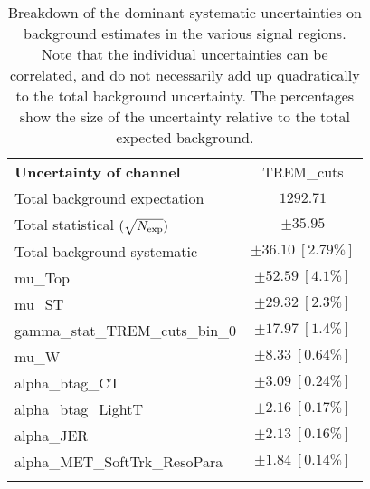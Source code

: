 
\begin{table}
\begin{center}
\setlength{\tabcolsep}{0.0pc}
\begin{tabular*}{\textwidth}{@{\extracolsep{\fill}}lc}
\noalign{\smallskip}\hline\noalign{\smallskip}
{\bf Uncertainty of channel}                                    & TREM\_cuts            \\
\noalign{\smallskip}\hline\noalign{\smallskip}
Total background expectation             &  $1292.71$       \\
\noalign{\smallskip}\hline\noalign{\smallskip}
Total statistical $(\sqrt{N_{\rm exp}})$              & $\pm 35.95$       \\
Total background systematic               & $\pm 36.10\ [2.79\%] $             \\
\noalign{\smallskip}\hline\noalign{\smallskip}
\noalign{\smallskip}\hline\noalign{\smallskip}
mu\_Top         & $\pm 52.59\ [4.1\%] $       \\
mu\_ST         & $\pm 29.32\ [2.3\%] $       \\
gamma\_stat\_TREM\_cuts\_bin\_0         & $\pm 17.97\ [1.4\%] $       \\
mu\_W         & $\pm 8.33\ [0.64\%] $       \\
alpha\_btag\_CT         & $\pm 3.09\ [0.24\%] $       \\
alpha\_btag\_LightT         & $\pm 2.16\ [0.17\%] $       \\
alpha\_JER         & $\pm 2.13\ [0.16\%] $       \\
alpha\_MET\_SoftTrk\_ResoPara         & $\pm 1.84\ [0.14\%] $       \\
\noalign{\smallskip}\hline\noalign{\smallskip}
\end{tabular*}
\end{center}
\caption[Breakdown of uncertainty on background estimates]{
Breakdown of the dominant systematic uncertainties on background estimates in the various signal regions.
Note that the individual uncertainties can be correlated, and do not necessarily add up quadratically to 
the total background uncertainty. The percentages show the size of the uncertainty relative to the total expected background.
\label{table.results.bkgestimate.uncertainties.TREM_cuts}}
\end{table}
%